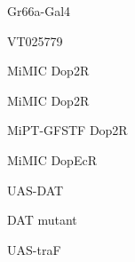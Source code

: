 \documentclass[17pt]{extarticle}
\begin{document}
\newpage{}
\vspace*{\fill}\begin{large}
Gr66a-Gal4 \\[0.5em]
\end{large}
\footnotesize
\vspace*{\fill}
\newpage{}
\vspace*{\fill}\begin{large}
VT025779 \\[0.5em]
\end{large}
\footnotesize
\vspace*{\fill}
\newpage{}
\vspace*{\fill}\begin{normalsize}
Mi{MIC} Dop2R \\[0.5em]
\end{normalsize}
\footnotesize
\vspace*{\fill}
\newpage{}
\vspace*{\fill}\begin{normalsize}
Mi{MIC} Dop2R \\[0.5em]
\end{normalsize}
\footnotesize
\vspace*{\fill}
\newpage{}
\vspace*{\fill}\begin{small}
Mi{PT-GFSTF} Dop2R \\[0.5em]
\end{small}
\footnotesize
\vspace*{\fill}
\newpage{}
\vspace*{\fill}\begin{normalsize}
Mi{MIC} DopEcR \\[0.5em]
\end{normalsize}
\footnotesize
\vspace*{\fill}
\newpage{}
\vspace*{\fill}\begin{large}
UAS-DAT \\[0.5em]
\end{large}
\footnotesize
\vspace*{\fill}
\newpage{}
\vspace*{\fill}\begin{large}
DAT mutant \\[0.5em]
\end{large}
\footnotesize
\vspace*{\fill}
\newpage{}
\vspace*{\fill}\begin{large}
UAS-traF \\[0.5em]
\end{large}
\end{document}
